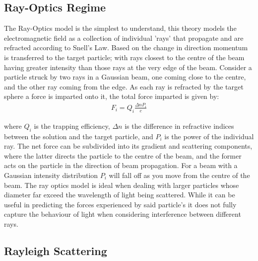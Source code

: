 \subsection{Ray-Optics Regime}

The Ray-Optics model is the simplest to understand, this theory models 
the electromagnetic field as a collection of individual 'rays' that 
propagate and are refracted according to Snell's Law. Based on the 
change in direction momentum is transferred to the target particle; 
with rays closest to the centre of the beam having greater intensity 
than those rays at the very edge of the beam. Consider a particle 
struck by two rays in a Gaussian beam, one coming close to the centre, 
and the other ray coming from the edge. As each ray is refracted by 
the target sphere a force is imparted onto it, the total force 
imparted is given by:
\begin{align}
	F_i = Q_i\frac{\Delta n P_i}{c}
\end{align}

\noindent 
where $Q_i$ is the trapping efficiency, $\Delta n$ is the difference
in refractive indices between the solution and the target particle,
and $P_i$ is the power of the individual ray. The net force can be 
subdivided into its gradient and scattering components, where the latter
directs the particle to the centre of the beam, and the former acts on 
the particle in the direction of beam propagation. For a beam with a
Gaussian intensity distribution $P_i$ will fall off as you move from
the centre of the beam. The ray optics model is ideal when dealing 
with larger particles whose diameter far exceed the wavelength of light
being scattered. While it can be useful in predicting the forces 
experienced by said particle's it does not fully capture the behaviour
of light when considering interference between different rays.

\subsection{Rayleigh Scattering}

